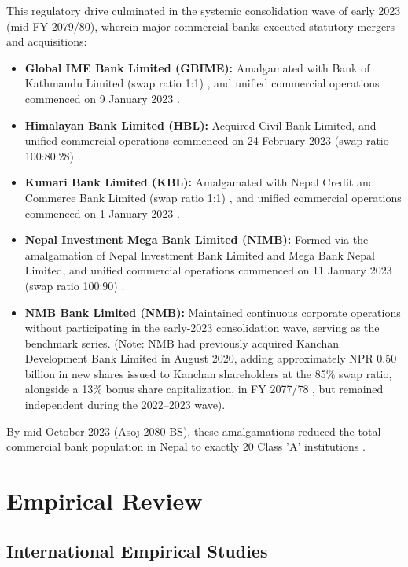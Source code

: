 This regulatory drive culminated in the systemic consolidation wave of early 2023 (mid-FY 2079/80), wherein major commercial banks executed statutory mergers and acquisitions:
\begin{itemize}
\item \textbf{Global IME Bank Limited (GBIME):} Amalgamated with Bank of Kathmandu Limited (swap ratio 1:1) \citep{gbime2023report}, and unified commercial operations commenced on 9 January 2023 \citep{nrb2023bsr}.
\item \textbf{Himalayan Bank Limited (HBL):} Acquired Civil Bank Limited, and unified commercial operations commenced on 24 February 2023 (swap ratio 100:80.28) \citep{hbl2023report}.
\item \textbf{Kumari Bank Limited (KBL):} Amalgamated with Nepal Credit and Commerce Bank Limited (swap ratio 1:1) \citep{kumari2022sgm,kbl2023report}, and unified commercial operations commenced on 1 January 2023 \citep{nrb2023bsr}.
\item \textbf{Nepal Investment Mega Bank Limited (NIMB):} Formed via the amalgamation of Nepal Investment Bank Limited and Mega Bank Nepal Limited, and unified commercial operations commenced on 11 January 2023 (swap ratio 100:90) \citep{nimb2023report}.
\item \textbf{NMB Bank Limited (NMB):} Maintained continuous corporate operations without participating in the early-2023 consolidation wave, serving as the benchmark series. (Note: NMB had previously acquired Kanchan Development Bank Limited in August 2020, adding approximately NPR 0.50 billion in new shares issued to Kanchan shareholders at the 85\% swap ratio, alongside a 13\% bonus share capitalization, in FY 2077/78 \citep{nmb2021report}, but remained independent during the 2022--2023 wave).
\end{itemize}

By mid-October 2023 (Asoj 2080 BS), these amalgamations reduced the total commercial bank population in Nepal to exactly 20 Class 'A' institutions \citep{nrb2023list}.

\section{Empirical Review}
\label{sec:empirical_review}

\subsection{International Empirical Studies}
\label{subsec:intl_empirical}

